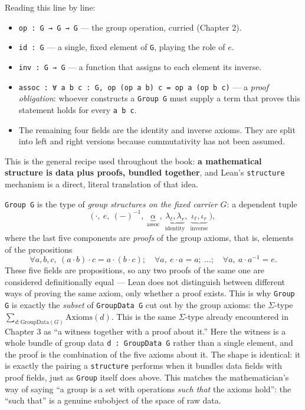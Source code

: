 Reading this line by line:

\begin{itemize}
\tightlist
\item
  \texttt{op : G → G → G} --- the group operation, curried (Chapter 2).
\item
  \texttt{id : G} --- a single, fixed element of \texttt{G}, playing the role of \(e\).
\item
  \texttt{inv : G → G} --- a function that assigns to each element its inverse.
\item
  \texttt{assoc : ∀ a b c : G, op (op a b) c = op a (op b c)} --- a \emph{proof obligation}: whoever constructs a \texttt{Group G} must supply a term that proves this statement holds for every \texttt{a b c}.
\item
  The remaining four fields are the identity and inverse axioms. They are split into left and right versions because commutativity has not been assumed.
\end{itemize}

This is the general recipe used throughout the book: \textbf{a mathematical structure is data plus proofs, bundled together}, and Lean's \texttt{structure} mechanism is a direct, literal translation of that idea.

\begin{mathreading}

\texttt{Group G} is the type of \emph{group structures on the fixed carrier \(G\)}: a dependent tuple \[
\Big(\,\cdot,\ e,\ (-)^{-1},\ \underbrace{\alpha}_{\text{assoc}},\
\underbrace{\lambda_\ell,\lambda_r}_{\text{identity}},\
\underbrace{\iota_\ell,\iota_r}_{\text{inverse}}\,\Big),
\] where the last five components are \emph{proofs} of the group axioms, that is, elements of the propositions \[
\forall a,b,c,\ (a\cdot b)\cdot c = a\cdot(b\cdot c);\quad
\forall a,\ e\cdot a = a;\ \ldots;\quad \forall a,\ a\cdot a^{-1}=e.
\] These five fields are propositions, so any two proofs of the same one are considered definitionally equal --- Lean does not distinguish between different ways of proving the same axiom, only whether a proof exists. This is why \texttt{Group G} is exactly the \emph{subset} of \texttt{GroupData G} cut out by the group axioms: the \(\Sigma\)-type \(\sum_{d : \mathrm{GroupData}(G)} \mathrm{Axioms}(d)\). This is the same \(\Sigma\)-type already encountered in Chapter 3 as ``a witness together with a proof about it.'' Here the witness is a whole bundle of group data \texttt{d : GroupData G} rather than a single element, and the proof is the combination of the five axioms about it. The shape is identical: it is exactly the pairing a \texttt{structure} performs when it bundles data fields with proof fields, just as \texttt{Group} itself does above. This matches the mathematician's way of saying ``a group is a set with operations \emph{such that} the axioms hold'': the ``such that'' is a genuine subobject of the space of raw data.

\end{mathreading}

